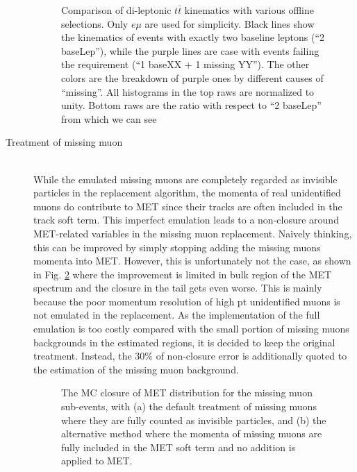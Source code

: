 \begin{description}
\begin{figure}[h]
    \caption{Comparison of di-leptonic $t\bar{t}$ kinematics with various offline selections. Only $e\mu$ are used for simplicity. Black lines show the kinematics of events with exactly two baseline leptons (``2 baseLep''), while the purple lines are case with events failing the requirement (``1 baseXX + 1 missing YY''). The other colors are the breakdown of purple ones by different causes of ``missing''. All histograms in the top raws are normalized to unity. Bottom raws are the ratio with respect to ``2 baseLep'' from which we can see    \label{fig::BGestimation::objRep::mcClosure::biasFrom2Lreq} }
\end{figure}
\fi

\item [Treatment of missing muon]  \mbox{} \\
While the emulated missing muons are completely regarded as invisible particles in the replacement algorithm, the momenta of real unidentified muons do contribute to MET since their tracks are often included in the track soft term. This imperfect emulation leads to a non-closure around MET-related variables in the missing muon replacement. Naively thinking, this can be improved by simply stopping adding the missing muons momenta into MET. However, this is unfortunately not the case, as shown in Fig. \ref{fig::BGestimation::objRep::mcClosure::metSoftTerm_mu} where the improvement is limited in bulk region of the MET spectrum and the closure in the tail gets even worse. This is mainly because the poor momentum resolution of high pt unidentified muons is not emulated in the replacement. As the implementation of the full emulation is too costly compared with the small portion of missing muons backgrounds in the estimated regions, it is decided to keep the original treatment. Instead, the $30\%$ of non-closure error is additionally quoted to the estimation of the missing muon background. \\

\begin{figure}[h]
  \centering
    \caption{The MC closure of MET distribution for the missing muon sub-events, with (a) the default treatment of missing muons where they are fully counted as invisible particles, and (b) the alternative method where the momenta of missing muons are fully included in the MET soft term and no addition is applied to MET.
      \label{fig::BGestimation::objRep::mcClosure::metSoftTerm_mu} }
\end{figure}



\end{description}
